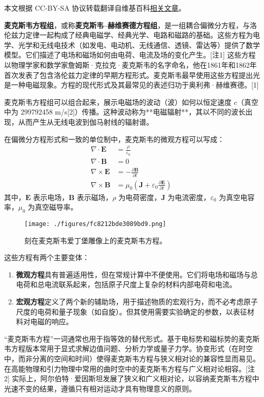 
本文根据 CC-BY-SA 协议转载翻译自维基百科\href{https://en.wikipedia.org/wiki/Maxwell\%27s_equations}{相关文章}。

\textbf{麦克斯韦方程组}，或称\textbf{麦克斯韦–赫维赛德方程组}，是一组耦合偏微分方程，与洛伦兹力定律一起构成了经典电磁学、经典光学、电路和磁路的基础。这些方程为电学、光学和无线电技术（如发电、电动机、无线通信、透镜、雷达等）提供了数学模型。它们描述了电场和磁场如何由电荷、电流及场的变化产生。[注1] 这些方程以物理学家和数学家詹姆斯·克拉克·麦克斯韦的名字命名，他在1861年和1862年首次发表了包含洛伦兹力定律的早期方程形式。麦克斯韦最早使用这些方程提出光是一种电磁现象。方程的现代形式及其最常见的表述归功于奥利弗·赫维赛德。[1]

麦克斯韦方程组可以组合起来，展示电磁场的波动（波）如何以恒定速度 \( c \)（真空中为 299792458 m/s[2]）传播。这种波动称为**电磁辐射**，其以不同的波长出现，从而产生从无线电波到伽马射线的辐射谱。

在偏微分方程形式和一致的单位制中，麦克斯韦的微观方程可以写成：
\[
\begin{aligned}
\nabla \cdot \mathbf{E} &= \frac{\rho}{\varepsilon_0} \\
\nabla \cdot \mathbf{B} &= 0 \\
\nabla \times \mathbf{E} &= -\frac{\partial \mathbf{B}}{\partial t} \\
\nabla \times \mathbf{B} &= \mu_0 \left(\mathbf{J} + \varepsilon_0 \frac{\partial \mathbf{E}}{\partial t}\right)
\end{aligned}~
\]
其中，\(\mathbf{E}\) 表示电场，\(\mathbf{B}\) 表示磁场，\(\rho\) 为电荷密度，\(\mathbf{J}\) 为电流密度，\(\varepsilon_0\) 为真空电容率，\(\mu_0\) 为真空磁导率。
\begin{figure}[ht]
\centering
\texttt{[image: ./figures/fc8212bde3089bd9.png]}
\caption{刻在麦克斯韦爱丁堡雕像上的麦克斯韦方程。} \label{fig_MAXS_1}
\end{figure}
这些方程有两个主要变体：
\begin{enumerate}
\item \textbf{微观方程}具有普遍适用性，但在常规计算中不便使用。它们将电场和磁场与总电荷和总电流联系起来，包括原子尺度上复杂的材料内部电荷和电流。
\item \textbf{宏观方程}定义了两个新的辅助场，用于描述物质的宏观行为，而不必考虑原子尺度的电荷和量子现象（如自旋）。但其使用需要实验确定的参数，以表征材料对电磁的响应。
\end{enumerate}
“麦克斯韦方程”一词通常也用于指等效的替代形式。基于电标势和磁标势的麦克斯韦方程版本常用于显式求解边值问题、分析力学或量子力学。协变形式（在时空中，而非分离的空间和时间）使得麦克斯韦方程与狭义相对论的兼容性显而易见。在高能物理和引力物理中常用的曲时空中的麦克斯韦方程与广义相对论相容。[注2] 实际上，阿尔伯特·爱因斯坦发展了狭义和广义相对论，以容纳麦克斯韦方程中光速不变的结果，遵循只有相对运动才具有物理意义的原则。

